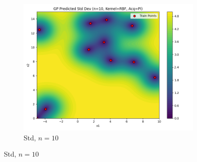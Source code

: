 \documentclass[a4paper,12pt]{article}
\begin{document}
\begin{figure}[H]
\begin{subfigure}{0.3\textwidth}
\end{subfigure} 
\begin{subfigure}{0.3\textwidth}
    \includegraphics[width=\linewidth]{Task-02/images/gp_std_rbf_n10_PI.png}
    \caption{Std, $n=10$}
\end{subfigure}


\end{figure}
\end{document}
